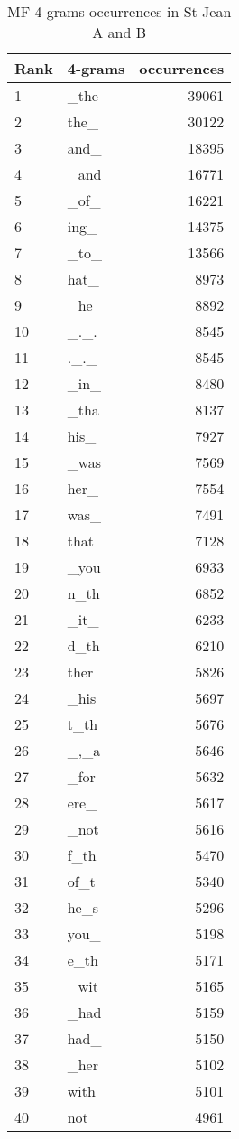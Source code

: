 \twocolumn

\begin{table}
  \centering
  \caption{MF 4-grams occurrences in St-Jean A and B}
  \label{tab:4_grams_occurences_st_jean}
  \begin{tabular}{l l r}
    \toprule
    Rank & 4-grams & occurrences \\
    \midrule
    1 & \_the & 39061 \\
    2 & the\_ & 30122 \\
    3 & and\_ & 18395 \\
    4 & \_and & 16771 \\
    5 & \_of\_ & 16221 \\
    6 & ing\_ & 14375 \\
    7 & \_to\_ & 13566 \\
    8 & hat\_ & 8973 \\
    9 & \_he\_ & 8892 \\
    10 & \_.\_. & 8545 \\
    11 & .\_.\_ & 8545 \\
    12 & \_in\_ & 8480 \\
    13 & \_tha & 8137 \\
    14 & his\_ & 7927 \\
    15 & \_was & 7569 \\
    16 & her\_ & 7554 \\
    17 & was\_ & 7491 \\
    18 & that & 7128 \\
    19 & \_you & 6933 \\
    20 & n\_th & 6852 \\
    21 & \_it\_ & 6233 \\
    22 & d\_th & 6210 \\
    23 & ther & 5826 \\
    24 & \_his & 5697 \\
    25 & t\_th & 5676 \\
    26 & \_,\_a & 5646 \\
    27 & \_for & 5632 \\
    28 & ere\_ & 5617 \\
    29 & \_not & 5616 \\
    30 & f\_th & 5470 \\
    31 & of\_t & 5340 \\
    32 & he\_s & 5296 \\
    33 & you\_ & 5198 \\
    34 & e\_th & 5171 \\
    35 & \_wit & 5165 \\
    36 & \_had & 5159 \\
    37 & had\_ & 5150 \\
    38 & \_her & 5102 \\
    39 & with & 5101 \\
    40 & not\_ & 4961 \\
    \bottomrule
  \end{tabular}
\end{table}

